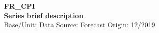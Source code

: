 \documentclass[a4paper,10pt]{article}
\begin{document}
\thispagestyle{empty}
\begin{landscape}
\begin{center}

\textbf{FR_CPI} \\ 

\textbf{Series brief description} \\ 

Base/Unit: 
\space \space \space Data Source:  
\space \space \space Forecast Origin: 12/2019 \\ 
\end{center}

\begin{footnotesize} \singlespacing  \end{footnotesize} 

\end{landscape}
\end{document}
